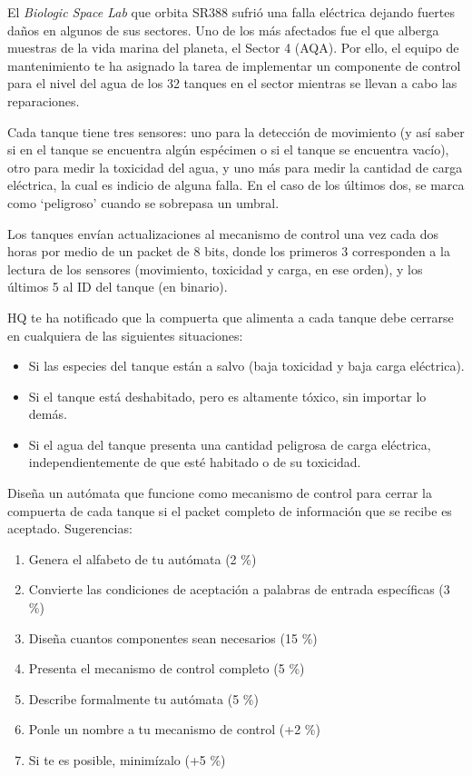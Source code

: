 \documentclass[8pt, onside]{article}
\begin{document}
El \textit{Biologic Space Lab} que orbita \textsc{SR388} sufrió una falla eléctrica dejando fuertes daños en algunos de sus sectores. Uno de los más afectados fue el que alberga muestras de la vida marina del planeta, el Sector 4 (AQA). Por ello, el equipo de mantenimiento te ha asignado la tarea de implementar un componente de control para el nivel del agua de los 32 tanques en el sector mientras se llevan a cabo las reparaciones.

Cada tanque tiene tres sensores: uno para la detección de movimiento (y así saber si en el tanque se encuentra algún espécimen o si el tanque se encuentra vacío), otro para medir la toxicidad del agua, y uno más para medir la cantidad de carga eléctrica, la cual es indicio de alguna falla. En el caso de los últimos dos, se marca como `peligroso' cuando se sobrepasa un umbral.

Los tanques envían actualizaciones al mecanismo de control una vez cada dos horas por medio de un packet de 8 bits, donde los primeros 3 corresponden a la lectura de los sensores (movimiento, toxicidad y carga, en ese orden), y los últimos 5 al ID del tanque (en binario).

HQ te ha notificado que la compuerta que alimenta a cada tanque debe cerrarse en cualquiera de las siguientes situaciones:

\begin{itemize}
    \itemsep0em
    \item Si las especies del tanque están a salvo (baja toxicidad y baja carga eléctrica).
    \item Si el tanque está deshabitado, pero es altamente tóxico, sin importar lo demás.
    \item Si el agua del tanque presenta una cantidad peligrosa de carga eléctrica, independientemente de que esté habitado o de su toxicidad.
\end{itemize}

Diseña un autómata que funcione como mecanismo de control para cerrar la compuerta de cada tanque si el packet completo de información que se recibe es aceptado. Sugerencias:

\begin{enumerate}[label=\tt \alph*)]
    \itemsep0em
    \item Genera el alfabeto de tu autómata (2 \%)
    \item Convierte las condiciones de aceptación a palabras de entrada específicas (3 \%)
    \item Diseña cuantos componentes sean necesarios (15 \%)
    \item Presenta el mecanismo de control completo (5 \%)
    \item Describe formalmente tu autómata (5 \%)
    \item Ponle un nombre a tu mecanismo de control (+2 \%)
    \item Si te es posible, minimízalo (+5 \%)
\end{enumerate}
\end{document}
